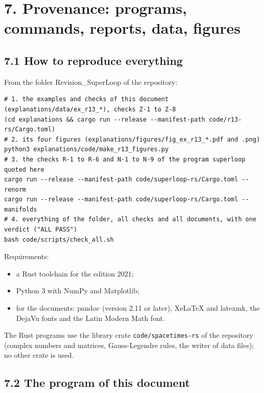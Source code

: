 \documentclass[
  10pt,
]{article}
\providecommand{\tightlist}{%
  \setlength{\itemsep}{0pt}\setlength{\parskip}{0pt}}
\begin{document}
\hypertarget{provenance-programs-commands-reports-data-figures}{%
\section{7. Provenance: programs, commands, reports, data,
figures}\label{provenance-programs-commands-reports-data-figures}}

\hypertarget{how-to-reproduce-everything}{%
\subsection{7.1 How to reproduce
everything}\label{how-to-reproduce-everything}}

From the folder Revision\_SuperLoop of the repository:

\begin{verbatim}
# 1. the examples and checks of this document (explanations/data/ex_r13_*), checks Z-1 to Z-8
(cd explanations && cargo run --release --manifest-path code/r13-rs/Cargo.toml)
# 2. its four figures (explanations/figures/fig_ex_r13_*.pdf and .png)
python3 explanations/code/make_r13_figures.py
# 3. the checks R-1 to R-6 and N-1 to N-9 of the program superloop quoted here
cargo run --release --manifest-path code/superloop-rs/Cargo.toml -- renorm
cargo run --release --manifest-path code/superloop-rs/Cargo.toml -- manifolds
# 4. everything of the folder, all checks and all documents, with one verdict ("ALL PASS")
bash code/scripts/check_all.sh
\end{verbatim}

Requirements:

\begin{itemize}
\tightlist
\item
  a Rust toolchain for the edition 2021;
\item
  Python 3 with NumPy and Matplotlib;
\item
  for the documents: pandoc (version 2.11 or later), XeLaTeX and
  latexmk, the DejaVu fonts and the Latin Modern Math font.
\end{itemize}

The Rust programs use the library crate \texttt{code/spacetimes-rs} of
the repository (complex numbers and matrices, Gauss-Legendre rules, the
writer of data files); no other crate is used.

\hypertarget{the-program-of-this-document}{%
\subsection{7.2 The program of this
document}\label{the-program-of-this-document}}
\end{document}
